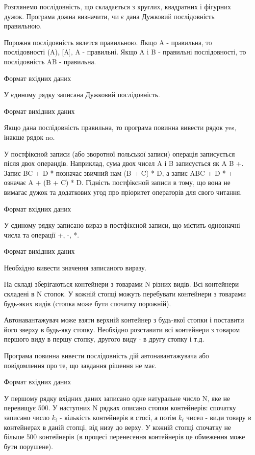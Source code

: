 \documentclass[]{article}
\begin{document}
Розглянемо послідовність, що складається з круглих, квадратних і фігурних дужок. Програма дожна визначити, чи є дана Дужковий послідовність правильною.

Порожня послідовність явлется правильною. Якщо A - правильна, то послідовності (A), [A], {A} - правильні. Якщо A і B - правильні послідовності, то послідовність AB - правильна.

Формат вхідних даних

У єдиному рядку записана Дужковий послідовність.

Формат вихідних даних

Якщо дана послідовність правильна, то програма повинна вивести рядок yes, інакше рядок no.


У постфіксной записи (або зворотної польської записи) операція записується після двох операндів. Наприклад, сума двох чисел A і B записується як A B +. Запис BC + D * позначає звичний нам (B + C) * D, а запис ABC + D * + означає A + (B + C) * D. Гідність постфіксной записи в тому, що вона не вимагає дужок та додаткових угод про пріоритет операторів для свого читання.

Формат вхідних даних

У єдиному рядку записано вираз в постфіксной записи, що містить однозначні числа та операції +, -, *.

Формат вихідних даних

Необхідно вивести значення записаного виразу.


На складі зберігаються контейнери з товарами N різних видів. Всі контейнери складені в N стопок. У кожній стопці можуть перебувати контейнери з товарами будь-яких видів (стопка може бути спочатку порожній).

Автонавантажувач може взяти верхній контейнер з будь-якої стопки і поставити його зверху в будь-яку стопку. Необхідно розставити всі контейнери з товаром першого виду в першу стопку, другого виду - в другу стопку і т.д.

Програма повинна вивести послідовність дій автонавантажувача або повідомлення про те, що завдання рішення не має.

Формат вхідних даних

У першому рядку вхідних даних записано одне натуральне число N, яке не перевищує 500. У наступних N рядках описано стопки контейнерів: спочатку записано число $k_i$ - кількість контейнерів в стосі, а потім $k_i$ чисел - види товару в контейнерах в даній стопці, від низу до верху. У кожній стопці спочатку не більше 500 контейнерів (в процесі перенесення контейнерів це обмеження може бути порушене).
\end{document}
